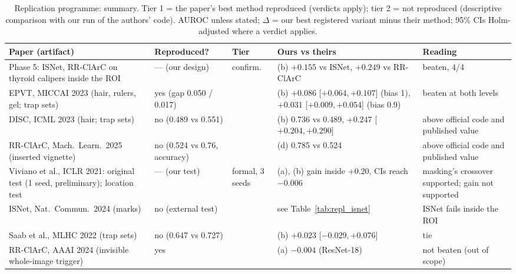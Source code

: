 \begin{table}[t]\centering\small
\caption{Replication programme: summary. Tier 1 = the paper's best method reproduced (verdicts apply); tier 2 = not
reproduced (descriptive comparison with our run of the authors' code). AUROC unless stated; $\Delta$ = our best
registered variant minus their method; 95\% CIs Holm-adjusted where a verdict applies.}\label{tab:repl_summary}
\begin{tabular}{>{\raggedright\arraybackslash}p{3.6cm}>{\raggedright\arraybackslash}p{2.5cm}>{\raggedright\arraybackslash}p{1.3cm}>{\raggedright\arraybackslash}p{4.4cm}>{\raggedright\arraybackslash}p{2.8cm}}\toprule
Paper (artifact) & Reproduced? & Tier & Ours vs theirs & Reading\\\midrule
Phase 5: ISNet, RR-ClArC on thyroid calipers inside the ROI & --- (our design) & confirm. & (b) $+0.155$ vs ISNet, $+0.249$ vs RR-ClArC & beaten, 4/4 \\
EPVT, MICCAI 2023 (hair, rulers, gel; trap sets) & yes (gap 0.050 / 0.017) & 1 & (b) $+0.086$ [$+0.064,+0.107$] (bias 1), $+0.031$ [$+0.009,+0.054$] (bias 0.9) & beaten at both levels\\
DISC, ICML 2023 (hair; trap sets) & no (0.489 vs 0.551) & 2 & (b) 0.736 vs 0.489, $+0.247$ [$+0.204,+0.290$] & above official code and published value\\
RR-ClArC, Mach.\ Learn.\ 2025 (inserted vignette) & no (0.524 vs 0.76, accuracy) & 2 & (d) 0.785 vs 0.524 & above official code and published value\\
Viviano et al., ICLR 2021: original test (1 seed, preliminary); location test & --- (our test) & formal, 3 seeds & (a), (b) gain inside $+0.20$, CIs reach $-0.006$ & masking's crossover supported; gain not supported\\
ISNet, Nat.\ Commun.\ 2024 (marks) & no (external test) & 2 & see Table~\ref{tab:repl_isnet} & ISNet fails inside the ROI\\
Saab et al., MLHC 2022 (trap sets) & no (0.647 vs 0.727) & 2 & (b) $+0.023$ [$-0.029,+0.076$] & tie\\
RR-ClArC, AAAI 2024 (invisible whole-image trigger) & yes & 1 & (a) $-0.004$ (ResNet-18) & not beaten (out of scope)\\
\bottomrule\end{tabular}\end{table}

